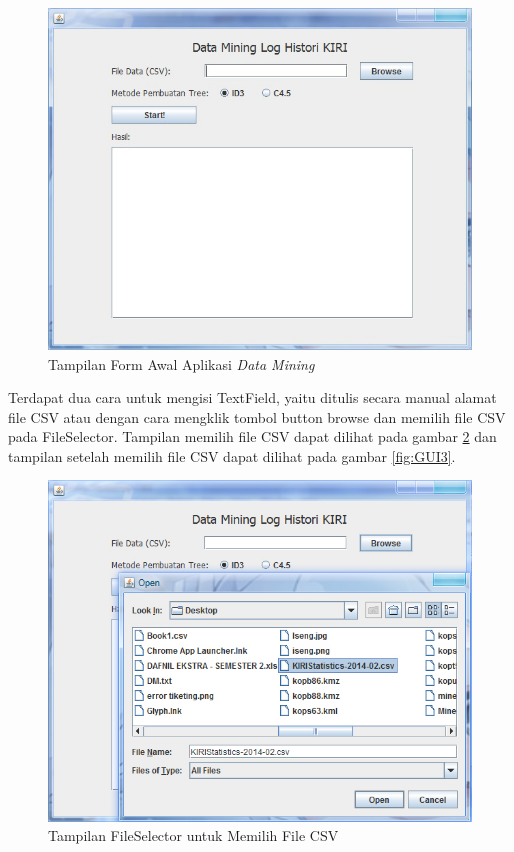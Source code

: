 \begin{figure}[H]
\centering
\includegraphics[scale=0.7]{Gambar/GUI1.jpg}
\caption[Tampilan Form Awal Aplikasi \textsl{Data Mining}]{Tampilan Form Awal Aplikasi \textsl{Data Mining}} 
\label{fig:GUI1}
\end{figure}

Terdapat dua cara untuk mengisi TextField, yaitu ditulis secara manual alamat file CSV atau dengan cara mengklik tombol button browse dan memilih file CSV pada FileSelector. Tampilan memilih file CSV dapat dilihat pada gambar \ref{fig:GUI2} dan tampilan setelah memilih file CSV dapat dilihat pada gambar \ref{fig:GUI3}.

\begin{figure}[H]
\centering
\includegraphics[scale=0.7]{Gambar/GUI2.jpg}
\caption[Tampilan FileSelector untuk Memilih File CSV]{Tampilan FileSelector untuk Memilih File CSV} 
\label{fig:GUI2}
\end{figure}

